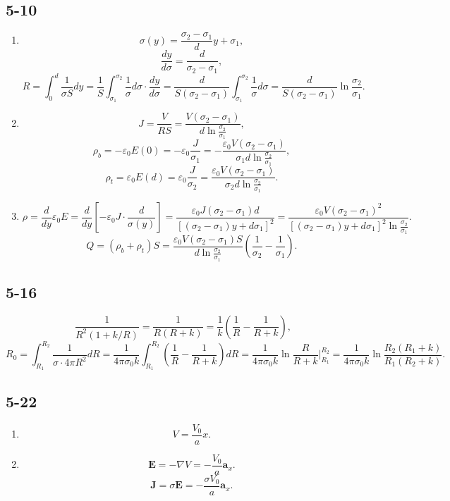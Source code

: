 \documentclass[6pt,a4paper]{article}
\begin{document}
\subsection{5-10}
\begin{enumerate}[label=\alph*)]
\item
$$\sigma(y)=\frac{\sigma_2-\sigma_1}{d}y+\sigma_1,$$
$$\frac{dy}{d\sigma}=\frac{d}{\sigma_2-\sigma_1},$$
$$R=\int_0^d\frac{1}{\sigma S}dy=\frac{1}{S}\int_{\sigma_1}^{\sigma_2}\frac{1}{\sigma}d\sigma\cdot\frac{dy}{d\sigma}=\frac{d}{S(\sigma_2-\sigma_1)}\int_{\sigma_1}^{\sigma_2}\frac{1}{\sigma}d\sigma=\frac{d}{S(\sigma_2-\sigma_1)}\ln\frac{\sigma_2}{\sigma_1}.$$
\item
$$J=\frac{V}{RS}=\frac{V(\sigma_2-\sigma_1)}{d\ln\frac{\sigma_2}{\sigma_1}},$$
$$\rho_b=-\varepsilon_0E(0)=-\varepsilon_0\frac{J}{\sigma_1}=-\frac{\varepsilon_0V(\sigma_2-\sigma_1)}{\sigma_1d\ln\frac{\sigma_2}{\sigma_1}},$$
$$\rho_t=\varepsilon_0E(d)=\varepsilon_0\frac{J}{\sigma_2}=\frac{\varepsilon_0V(\sigma_2-\sigma_1)}{\sigma_2d\ln\frac{\sigma_2}{\sigma_1}}.$$
\item
$$\rho=\frac{d}{dy}\varepsilon_0E=\frac{d}{dy}\left[-\varepsilon_0J\cdot\frac{d}{\sigma(y)}\right]=\frac{\varepsilon_0J(\sigma_2-\sigma_1)d}{[(\sigma_2-\sigma_1)y+d\sigma_1]^2}=\frac{\varepsilon_0V(\sigma_2-\sigma_1)^2}{[(\sigma_2-\sigma_1)y+d\sigma_1]^2\ln\frac{\sigma_2}{\sigma_1}}.$$
$$Q=(\rho_b+\rho_t)S=\frac{\varepsilon_0V(\sigma_2-\sigma_1)S}{d\ln\frac{\sigma_2}{\sigma_1}}\left(\frac{1}{\sigma_2}-\frac{1}{\sigma_1}\right).$$
\end{enumerate}

\subsection{5-16}
$$\frac{1}{R^2(1+k/R)}=\frac{1}{R(R+k)}=\frac{1}{k}\left(\frac{1}{R}-\frac{1}{R+k}\right),$$
$$R_0=\int_{R_1}^{R_2}\frac{1}{\sigma\cdot 4\pi R^2}dR=\frac{1}{4\pi\sigma_0k}\int_{R_1}^{R_2}\left(\frac{1}{R}-\frac{1}{R+k}\right)dR=\frac{1}{4\pi\sigma_0k}\ln\frac{R}{R+k}\bigg|_{R_1}^{R_2}=\frac{1}{4\pi\sigma_0k}\ln\frac{R_2(R_1+k)}{R_1(R_2+k)}.$$

\subsection{5-22}
\begin{enumerate}[label=\alph*)]
\item
$$V=\frac{V_0}{a}x.$$
\item
$$\mathbf{E}=-\nabla V=-\frac{V_0}{a}\mathbf{a}_x.$$
$$\mathbf{J}=\sigma \mathbf{E}=-\frac{\sigma V_0}{a}\mathbf{a}_x.$$
\end{enumerate}
\end{document}
